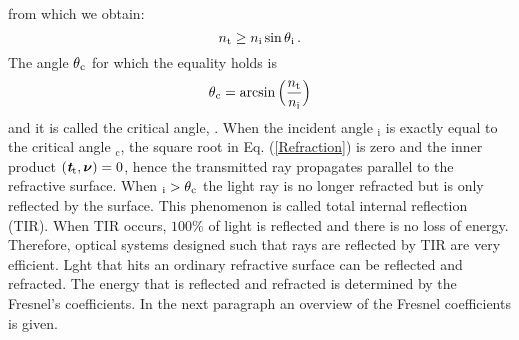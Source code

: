 from which we obtain:
\begin{equation}
 n_\textrm{t}\geq n_\textrm{i} \sin\mbox{$\theta$}_\textrm{i}\,.
\end{equation}
 The angle $\mbox{$\theta$}_{\textrm{c}}$ for which the equality holds is
\begin{equation}\label{critical}
\mbox{$\theta$}_{\textrm{c}} = \arcsin\Big(\frac{n_\textrm{t}}{n_\textrm{i}}\Big)
\end{equation} and it is called the critical angle, \cite{chaves2015introduction}.
When the incident angle \myangle$_{\textrm{i}}$ is exactly equal to the critical angle \myangle$_{\textrm{c}}$, the square root in Eq. (\ref{Refraction}) is zero and the inner product $(\textit{\textbf{t}}_\textrm{t},\boldsymbol{\nu})=0$, hence the transmitted ray propagates parallel to the refractive surface. 
When \myangle$_{\textrm{i}}>\mbox{$\theta$}_{\textrm{c}}$ the light ray is no longer refracted but is only reflected by the surface. This phenomenon is called total internal reflection (TIR). When TIR occurs, $100\%$ of light is reflected and there is no loss of energy. Therefore, optical systems designed such that rays are reflected by TIR are very efficient. Lght that hits an ordinary refractive surface can be reflected and refracted. The energy that is reflected and refracted is determined by the Fresnel's coefficients.
In the next paragraph an overview of the Fresnel coefficients is given.

